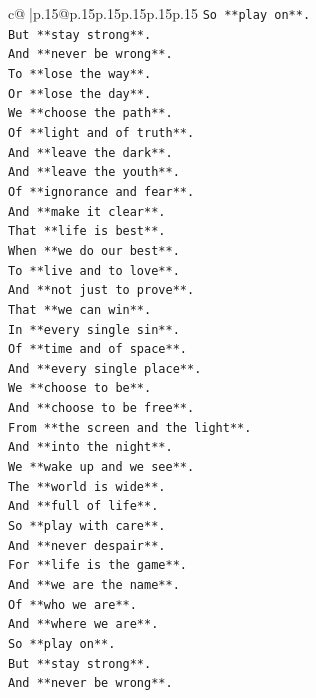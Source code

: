 \documentclass{article}
\begin{document}
{\begin{supertabular}{c@{$\;$}|p{.15\linewidth}@{}p{.15\linewidth}p{.15\linewidth}p{.15\linewidth}p{.15\linewidth}p{.15\linewidth}}
{{{\texttt{So **play on**.} \\
\texttt{But **stay strong**.} \\
\texttt{And **never be wrong**.} \\
\texttt{To **lose the way**.} \\
\texttt{Or **lose the day**.} \\
\texttt{We **choose the path**.} \\
\texttt{Of **light and of truth**.} \\
\texttt{And **leave the dark**.} \\
\texttt{And **leave the youth**.} \\
\texttt{Of **ignorance and fear**.} \\
\texttt{And **make it clear**.} \\
\texttt{That **life is best**.} \\
\texttt{When **we do our best**.} \\
\texttt{To **live and to love**.} \\
\texttt{And **not just to prove**.} \\
\texttt{That **we can win**.} \\
\texttt{In **every single sin**.} \\
\texttt{Of **time and of space**.} \\
\texttt{And **every single place**.} \\
\texttt{We **choose to be**.} \\
\texttt{And **choose to be free**.} \\
\texttt{From **the screen and the light**.} \\
\texttt{And **into the night**.} \\
\texttt{We **wake up and we see**.} \\
\texttt{The **world is wide**.} \\
\texttt{And **full of life**.} \\
\texttt{So **play with care**.} \\
\texttt{And **never despair**.} \\
\texttt{For **life is the game**.} \\
\texttt{And **we are the name**.} \\
\texttt{Of **who we are**.} \\
\texttt{And **where we are**.} \\
\texttt{So **play on**.} \\
\texttt{But **stay strong**.} \\
\texttt{And **never be wrong**.} \\
}}}
\end{supertabular}}
\end{document}
